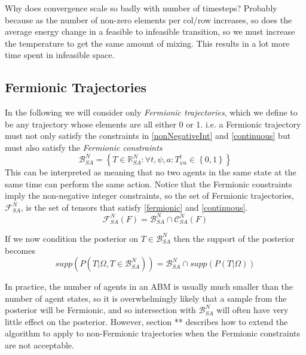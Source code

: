\documentclass{article}
\begin{document}
Why does convergence scale so badly with number of timesteps? Probably because as the number of non-zero elements per col/row increases, so does the average energy change in a feasible to infeasible transition, so we must increase the temperature to get the same amount of mixing. This results in a lot more time spent in infeasible space. 

\subsection{Fermionic Trajectories}

In the following we will consider only \textit{Fermionic trajectories}, which we define to be any trajectory whose elements are all either 0 or 1. i.e. a Fermionic trajectory must not only satisfy the constraints in \eqref{nonNegativeInt} and \eqref{continuous} but must also satisfy the \textit{Fermionic constraints}
\begin{equation}
\mathcal{B}^N_{SA} = \left\{T\in\mathbb{R}^N_{SA} : \forall t,\psi,a: T^t_{\psi a} \in \left\{ 0,1 \right\}\right\}
\label{fermionic}
\end{equation}
This can be interpreted as meaning that no two agents in the same state at the same time can perform the same action. Notice that the Fermionic constraints imply the non-negative integer constraints, so the set of Fermionic trajectories, $\mathcal{F}^N_{SA}$, is the set of tensors that satisfy \eqref{fermionic} and \eqref{continuous}.
\begin{equation}
\mathcal{F}^N_{SA}(F) = \mathcal{B}^N_{SA} \cap \mathcal{C}^N_{SA}(F)
\end{equation}

If we now condition the posterior on $T \in \mathcal{B}^N_{SA}$ then the support of the posterior becomes
\begin{equation}
supp(P(T|\Omega, T\in\mathcal{B}^N_{SA})) = \mathcal{B}^N_{SA} \cap supp(P(T|\Omega))
\label{fermionicSupport1}
\end{equation}

In practice, the number of agents in an ABM is usually much smaller than the number of agent states, so it is overwhelmingly likely that a sample from the posterior will be Fermionic, and so intersection with $\mathcal{B}^N_{SA}$ will often have very little effect on the posterior. However, section ** describes how to extend the algorithm to apply to non-Fermionic trajectories when the Fermionic constraints are not acceptable.
\end{document}

